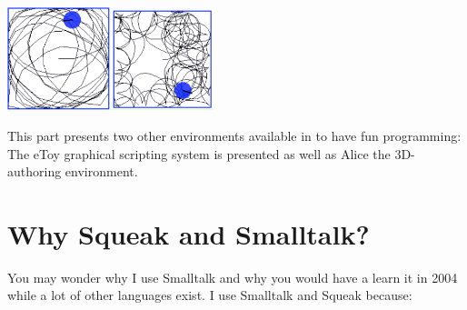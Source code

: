 \begin{description}
\begin{center}
\includegraphics[width=3cm]{followBorder2}\includegraphics[width=3cm]{oppositeBorderOfBox}
\end{center}

\item{}
This part presents two other environments available in \sq to have fun programming:  The eToy graphical scripting system is presented as well as Alice the 3D-authoring environment.
\end{description}


\section*{Why Squeak and Smalltalk?}

You may wonder why I use Smalltalk and why you would have a learn it in 2004 while a 
lot of other languages exist. I use Smalltalk and Squeak because:

